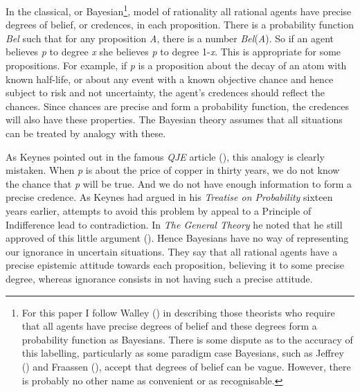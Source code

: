 \documentclass[
  11pt,
  letterpaper,
  DIV=11,
  numbers=noendperiod,
  twoside]{scrartcl}
\begin{document}
In the classical, or Bayesian\footnote{For this paper I follow Walley
  () in describing those theorists who
  require that all agents have precise degrees of belief and these
  degrees form a probability function as Bayesians. There is some
  dispute as to the accuracy of this labelling, particularly as some
  paradigm case Bayesians, such as Jeffrey
  () and Fraassen
  (), accept that degrees of belief
  can be vague. However, there is probably no other name as convenient
  or as recognisable.}, model of rationality all rational agents have
precise degrees of belief, or credences, in each proposition. There is a
probability function \emph{Bel} such that for any proposition \emph{A},
there is a number \emph{Bel}(\emph{A}). So if an agent believes \emph{p}
to degree \emph{x} she believes \emph{p} to degree 1-\emph{x}. This is
appropriate for some propositions. For example, if \emph{p} is a
proposition about the decay of an atom with known half-life, or about
any event with a known objective chance and hence subject to risk and
not uncertainty, the agent's credences should reflect the chances. Since
chances are precise and form a probability function, the credences will
also have these properties. The Bayesian theory assumes that all
situations can be treated by analogy with these.

As Keynes pointed out in the famous \emph{QJE} article
(), this analogy is clearly
mistaken. When \emph{p} is about the price of copper in thirty years, we
do not know the chance that \emph{p} will be true. And we do not have
enough information to form a precise credence. As Keynes had argued in
his \emph{Treatise on Probability} sixteen years earlier, attempts to
avoid this problem by appeal to a Principle of Indifference lead to
contradiction. In \emph{The General Theory} he noted that he still
approved of this little argument (). Hence Bayesians have no way of representing our ignorance in
uncertain situations. They say that all rational agents have a precise
epistemic attitude towards each proposition, believing it to some
precise degree, whereas ignorance consists in not having such a precise
attitude.
\end{document}
